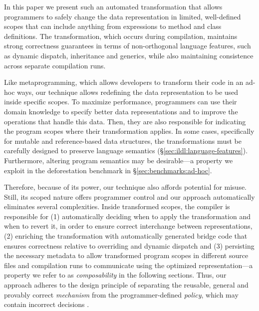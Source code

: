 In this paper we present such an automated transformation that allows programmers to safely change the data representation in limited, well-defined scopes that can include anything from expressions to method and class definitions. The transformation, which occurs during compilation, maintains strong correctness guarantees in terms of non-orthogonal language features, such as dynamic dispatch, inheritance and generics, while also maintaining consistence across separate compilation runs.

Like metaprogramming, which allows developers to transform their code
in an ad-hoc ways, our technique allows redefining the data
representation to be used inside specific scopes. To maximize
performance, programmers can use their domain knowledge to specify
better data representations and to improve the operations that handle
this data. Then, they are also responsible for indicating the program
scopes where their transformation applies. In some cases, specifically
for mutable and reference-based data structures, the transformations
must be carefully designed to preserve language semantics
(\S\ref{sec:ildl:language-features}). Furthermore, altering program
semantics may be desirable---a property we exploit in the
deforestation benchmark in \S\ref{sec:benchmarks:ad-hoc}.

Therefore, because of its power, our technique also affords potential
for misuse.  Still, its scoped nature offers programmer control and
our approach automatically eliminates several complexities.  Inside
transformed scopes, the compiler is responsible for (1) automatically
deciding when to apply the transformation and when to revert it, in
order to ensure correct interchange between representations, (2)
enriching the transformation with automatically generated bridge code
that ensures correctness relative to overriding and dynamic dispatch
and (3) persisting the necessary metadata to allow transformed program
scopes in different source files and compilation runs to communicate
using the optimized representation---a property we refer to as
\emph{composability} in the following sections. Thus, our approach
adheres to the design principle of separating the reusable, general
and provably correct \emph{mechanism} from the programmer-defined
\emph{policy}, which may contain incorrect decisions
\cite{lampson-mechanism-policy}.

